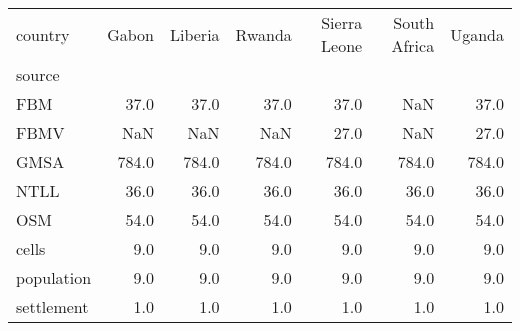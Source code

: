 \begin{tabular}{lrrrrrr}
\toprule
country &  Gabon &  Liberia &  Rwanda &  Sierra Leone &  South Africa &  Uganda \\
source     &        &          &         &               &               &         \\
\midrule
FBM        &   37.0 &     37.0 &    37.0 &          37.0 &           NaN &    37.0 \\
FBMV       &    NaN &      NaN &     NaN &          27.0 &           NaN &    27.0 \\
GMSA       &  784.0 &    784.0 &   784.0 &         784.0 &         784.0 &   784.0 \\
NTLL       &   36.0 &     36.0 &    36.0 &          36.0 &          36.0 &    36.0 \\
OSM        &   54.0 &     54.0 &    54.0 &          54.0 &          54.0 &    54.0 \\
cells      &    9.0 &      9.0 &     9.0 &           9.0 &           9.0 &     9.0 \\
population &    9.0 &      9.0 &     9.0 &           9.0 &           9.0 &     9.0 \\
settlement &    1.0 &      1.0 &     1.0 &           1.0 &           1.0 &     1.0 \\
\bottomrule
\end{tabular}
